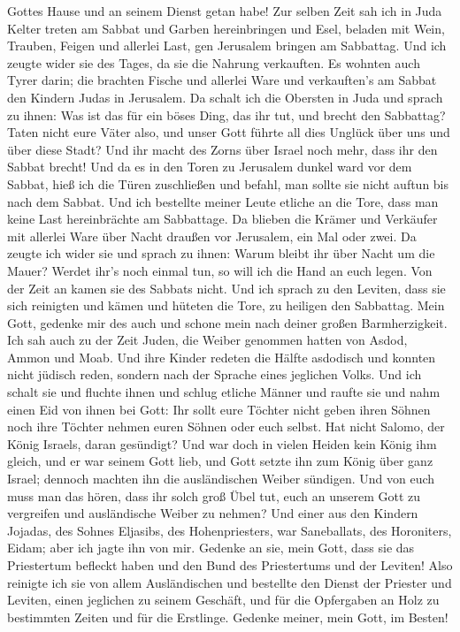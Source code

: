 Gottes Hause und an seinem Dienst getan habe!  Zur selben
Zeit sah ich in Juda Kelter treten am Sabbat und Garben hereinbringen
und Esel, beladen mit Wein, Trauben, Feigen und allerlei Last, gen
Jerusalem bringen am Sabbattag. Und ich zeugte wider sie des Tages, da
sie die Nahrung verkauften.  Es wohnten auch Tyrer darin;
die brachten Fische und allerlei Ware und verkauften's am Sabbat den
Kindern Judas in Jerusalem.  Da schalt ich die Obersten in
Juda und sprach zu ihnen: Was ist das für ein böses Ding, das ihr tut,
und brecht den Sabbattag?  Taten nicht eure Väter also, und
unser Gott führte all dies Unglück über uns und über diese Stadt? Und
ihr macht des Zorns über Israel noch mehr, dass ihr den Sabbat brecht!
 Und da es in den Toren zu Jerusalem dunkel ward vor dem
Sabbat, hieß ich die Türen zuschließen und befahl, man sollte sie nicht
auftun bis nach dem Sabbat. Und ich bestellte meiner Leute etliche an
die Tore, dass man keine Last hereinbrächte am Sabbattage. 
Da blieben die Krämer und Verkäufer mit allerlei Ware über Nacht draußen
vor Jerusalem, ein Mal oder zwei.  Da zeugte ich wider sie
und sprach zu ihnen: Warum bleibt ihr über Nacht um die Mauer? Werdet
ihr's noch einmal tun, so will ich die Hand an euch legen. Von der Zeit
an kamen sie des Sabbats nicht.  Und ich sprach zu den
Leviten, dass sie sich reinigten und kämen und hüteten die Tore, zu
heiligen den Sabbattag. Mein Gott, gedenke mir des auch und schone mein
nach deiner großen Barmherzigkeit.  Ich sah auch zu der
Zeit Juden, die Weiber genommen hatten von Asdod, Ammon und Moab.
 Und ihre Kinder redeten die Hälfte asdodisch und konnten
nicht jüdisch reden, sondern nach der Sprache eines jeglichen Volks.
 Und ich schalt sie und fluchte ihnen und schlug etliche
Männer und raufte sie und nahm einen Eid von ihnen bei Gott: Ihr sollt
eure Töchter nicht geben ihren Söhnen noch ihre Töchter nehmen euren
Söhnen oder euch selbst.  Hat nicht Salomo, der König
Israels, daran gesündigt? Und war doch in vielen Heiden kein König ihm
gleich, und er war seinem Gott lieb, und Gott setzte ihn zum König über
ganz Israel; dennoch machten ihn die ausländischen Weiber sündigen.
 Und von euch muss man das hören, dass ihr solch groß Übel
tut, euch an unserem Gott zu vergreifen und ausländische Weiber zu
nehmen?  Und einer aus den Kindern Jojadas, des Sohnes
Eljasibs, des Hohenpriesters, war Saneballats, des Horoniters, Eidam;
aber ich jagte ihn von mir.  Gedenke an sie, mein Gott,
dass sie das Priestertum befleckt haben und den Bund des Priestertums
und der Leviten!  Also reinigte ich sie von allem
Ausländischen und bestellte den Dienst der Priester und Leviten, einen
jeglichen zu seinem Geschäft,  und für die Opfergaben an
Holz zu bestimmten Zeiten und für die Erstlinge. Gedenke meiner, mein
Gott, im Besten!
